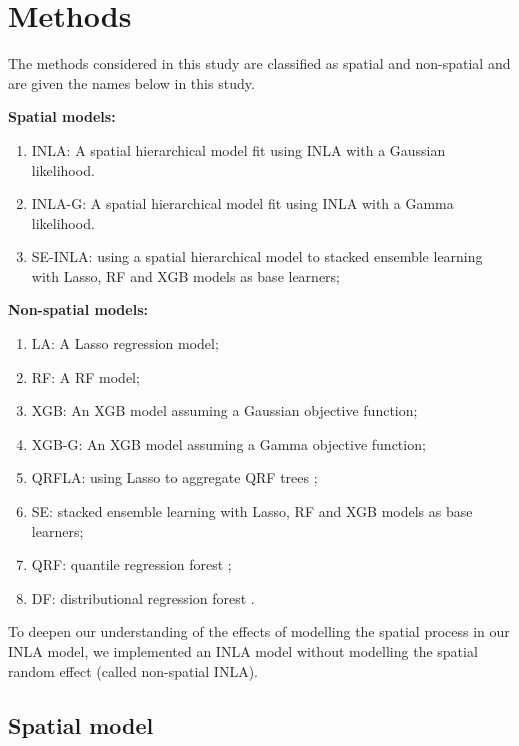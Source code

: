 \documentclass{article}
\begin{document}
\section {Methods}

The methods considered in this study are classified as spatial and non-spatial and are given the names below in this study. 


\noindent\textbf{Spatial models:}
\begin{enumerate}
\item INLA: A spatial hierarchical model fit using INLA with a Gaussian likelihood.  
\item INLA-G: A spatial hierarchical model fit using INLA with a Gamma likelihood. 
\item SE-INLA: using a spatial hierarchical model to stacked ensemble learning with Lasso, RF and XGB models as base learners;
\end{enumerate}


\noindent\textbf{Non-spatial models:}
\begin{enumerate}
\item LA: A Lasso regression model; 
\item RF: A RF model; 
\item XGB: An XGB model assuming a Gaussian objective function; 
\item XGB-G: An XGB model assuming a Gamma objective function; 
\item QRFLA: using Lasso to aggregate QRF trees \citep{hastie2009elements};
\item SE: stacked ensemble learning with Lasso, RF and XGB models as base learners; 
\item QRF: quantile regression forest \citep{meinshausen2006quantile};
\item DF: distributional regression forest \citep{schlosser2019distributional}.
\end{enumerate}

To deepen our understanding of the effects of modelling the spatial process in our INLA model, we implemented an INLA model without modelling the spatial random effect (called non-spatial INLA). 


\subsection{Spatial model}
\end{document}
